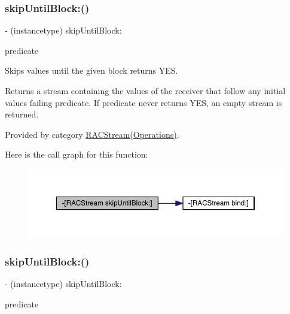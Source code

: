 \subsubsection{\texorpdfstring{skip\+Until\+Block\+:()}{skipUntilBlock:()}\hspace{0.1cm}{\footnotesize\ttfamily [1/3]}}
{\footnotesize\ttfamily -\/ (instancetype) skip\+Until\+Block\+: \begin{DoxyParamCaption}\item[{(B\+O\+OL($^\wedge$)(id x))}]{predicate }\end{DoxyParamCaption}}

Skips values until the given block returns {\ttfamily Y\+ES}.

Returns a stream containing the values of the receiver that follow any initial values failing {\ttfamily predicate}. If {\ttfamily predicate} never returns {\ttfamily Y\+ES}, an empty stream is returned. 

Provided by category \mbox{\hyperlink{category_r_a_c_stream_07_operations_08_a008935d03ebc55b40b461dc080cddd38}{R\+A\+C\+Stream(\+Operations)}}.

Here is the call graph for this function\+:\nopagebreak
\begin{figure}[H]
\begin{center}
\leavevmode
\includegraphics[width=350pt]{interface_r_a_c_stream_a008935d03ebc55b40b461dc080cddd38_cgraph}
\end{center}
\end{figure}
\mbox{\label{interface_r_a_c_stream_a008935d03ebc55b40b461dc080cddd38}} 
\subsubsection{\texorpdfstring{skip\+Until\+Block\+:()}{skipUntilBlock:()}\hspace{0.1cm}{\footnotesize\ttfamily [2/3]}}
{\footnotesize\ttfamily -\/ (instancetype) skip\+Until\+Block\+: \begin{DoxyParamCaption}\item[{(B\+O\+OL($^\wedge$)(id x))}]{predicate }\end{DoxyParamCaption}}

